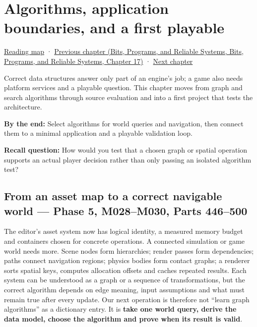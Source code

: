 \hypertarget{05-engine-i-ch008}{}
\chapter{Algorithms, application boundaries, and a first playable}\label{stagechapter:05-engine-i-ch008}\label{05-engine-i-ch008-algorithms-application-boundaries-and-a-first-playable}

\hyperref[volume-reading-map]{Reading map} · \href{../01-Bits-Programs-and-Reliable-Systems/main.pdf\#nameddest=05-engine-i-ch007-typed-apis-and-measured-cpu-data-structures}{Previous chapter (Bits, Programs, and Reliable Systems, Bits, Programs, and Reliable Systems, Chapter 17)} · \hyperref[05-engine-i-ch009-player-choices-rules-and-readable-feedback]{Next chapter}

Correct data structures answer only part of an engine's job; a game also needs platform services and a playable question. This chapter moves from graph and search algorithms through source evaluation and into a first project that tests the architecture.

\textbf{By the end:} Select algorithms for world queries and navigation, then connect them to a minimal application and a playable validation loop.

\textbf{Recall question:} How would you test that a chosen graph or spatial operation supports an actual player decision rather than only passing an isolated algorithm test?

\section{From an asset map to a correct navigable world --- Phase 5, M028--M030, Parts 446--500}\label{05-engine-i-ch008-from-an-asset-map-to-a-correct-navigable-world-phase-5-m028m030-parts-446500}

The editor's asset system now has logical identity, a measured memory budget and containers chosen for concrete operations. A connected simulation or game world needs more. Scene nodes form hierarchies; render passes form dependencies; paths connect navigation regions; physics bodies form contact graphs; a renderer sorts spatial keys, computes allocation offsets and caches repeated results. Each system can be understood as a graph or a sequence of transformations, but the correct algorithm depends on edge meaning, input assumptions and what must remain true after every update. Our next operation is therefore not ``learn graph algorithms'' as a dictionary entry. It is \textbf{take one world query, derive the data model, choose the algorithm and prove when its result is valid}.

